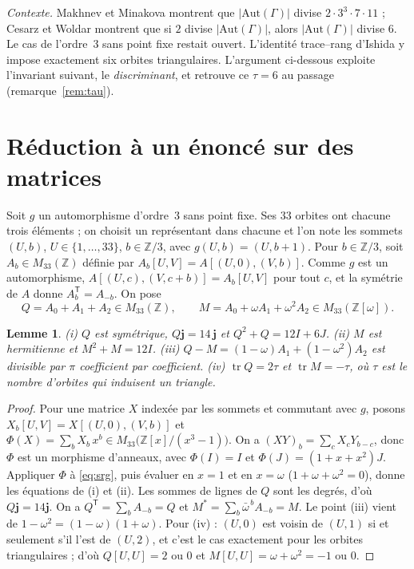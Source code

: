 \documentclass[11pt,a4paper]{article}
\newtheorem{lemma}[theorem]{Lemme}
\theoremstyle{remark}
\newcommand{\Z}{\mathbb{Z}}
\newcommand{\one}{\mathbf{j}}
\newcommand{\tr}{\operatorname{tr}}
\begin{document}
\emph{Contexte.} Makhnev et Minakova montrent que $|\mathrm{Aut}(\Gamma)|$ divise $2\cdot 3^3\cdot 7\cdot 11$ ; Cesarz et Woldar
\cite{CW23} montrent que si $2$ divise $|\mathrm{Aut}(\Gamma)|$, alors $|\mathrm{Aut}(\Gamma)|$ divise $6$. Le cas de l'ordre~3 sans
point fixe restait ouvert. L'identité trace--rang d'Ishida \cite{I26} y impose exactement six orbites triangulaires. L'argument
ci-dessous exploite l'invariant suivant, le \emph{discriminant}, et retrouve ce $\tau=6$ au passage (remarque~\ref{rem:tau}).

\section{Réduction à un énoncé sur des matrices}

Soit $g$ un automorphisme d'ordre~3 sans point fixe. Ses $33$ orbites ont chacune trois éléments ; on choisit un représentant dans
chacune et l'on note les sommets $(U,b)$, $U\in\{1,\dots,33\}$, $b\in\Z/3$, avec $g(U,b)=(U,b+1)$. Pour $b\in\Z/3$, soit
$A_b\in M_{33}(\Z)$ définie par $A_b[U,V]=A[(U,0),(V,b)]$. Comme $g$ est un automorphisme, $A[(U,c),(V,c+b)]=A_b[U,V]$ pour tout
$c$, et la symétrie de $A$ donne $A_b^{\mathsf T}=A_{-b}$. On pose
\[
Q=A_0+A_1+A_2\in M_{33}(\Z),\qquad M=A_0+\omega A_1+\omega^2A_2\in M_{33}(\Z[\omega]).
\]

\begin{lemma}\label{lem:QM}
(i) $Q$ est symétrique, $Q\one=14\,\one$ et $Q^2+Q=12I+6J$.
(ii) $M$ est hermitienne et $M^2+M=12I$.
(iii) $Q-M=(1-\omega)A_1+(1-\omega^2)A_2$ est divisible par $\pi$ coefficient par coefficient.
(iv) $\tr Q=2\tau$ et $\tr M=-\tau$, où $\tau$ est le nombre d'orbites qui induisent un triangle.
\end{lemma}
\begin{proof}
Pour une matrice $X$ indexée par les sommets et commutant avec $g$, posons $X_b[U,V]=X[(U,0),(V,b)]$ et
$\Phi(X)=\sum_b X_b\,x^b\in M_{33}\bigl(\Z[x]/(x^3-1)\bigr)$. On a $(XY)_b=\sum_c X_cY_{b-c}$, donc $\Phi$ est un morphisme d'anneaux,
avec $\Phi(I)=I$ et $\Phi(J)=(1+x+x^2)J$. Appliquer $\Phi$ à \eqref{eq:srg}, puis évaluer en $x=1$ et en $x=\omega$
($1+\omega+\omega^2=0$), donne les équations de (i) et (ii). Les sommes de lignes de $Q$ sont les degrés, d'où $Q\one=14\one$.
On a $Q^{\mathsf T}=\sum_b A_{-b}=Q$ et $M^*=\sum_b\bar\omega^{\,b}A_{-b}=M$. Le point (iii) vient de $1-\omega^2=(1-\omega)(1+\omega)$.
Pour (iv) : $(U,0)$ est voisin de $(U,1)$ si et seulement s'il l'est de $(U,2)$, et c'est le cas exactement pour les orbites
triangulaires ; d'où $Q[U,U]=2$ ou $0$ et $M[U,U]=\omega+\omega^2=-1$ ou $0$.
\end{proof}
\end{document}
